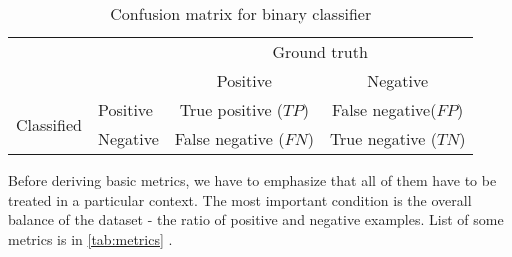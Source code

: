 \begin{table}[h]
    \centering
    \caption{Confusion matrix for binary classifier}
        \begin{tabular}{l|l|c|c|}
        \multicolumn{2}{c}{}&\multicolumn{2}{c}{Ground truth}\\
        \cline{3-4}
        \multicolumn{2}{c|}{}&Positive&Negative\\
        \cline{2-4}
        \multirow{2}{*}{Classified}& Positive & True positive ($TP$) & False negative($FP$)\\
        \cline{2-4}
        & Negative & False negative ($FN$) & True negative ($TN$)\\
        \cline{2-4}
        \end{tabular}
    \label{tab:confmatrix}
  \end{table}

Before deriving basic metrics, we have to emphasize that all of them have to be treated in a particular context. The most important condition is the overall balance of the dataset - the ratio of positive and negative examples. List of some metrics is in \ref{tab:metrics} .


